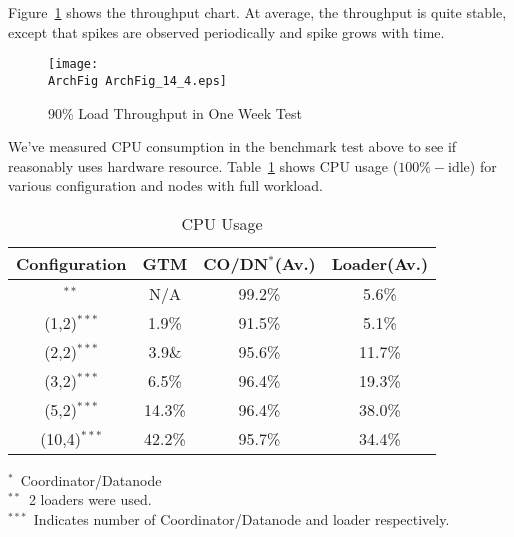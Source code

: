   Figure~\ref{archfig:17} shows the throughput chart. At average, the throughput is quite stable,
  except that spikes are observed periodically and spike grows with time.
  
  \begin{figure}[htp]
	  \begin{center}
		  \texttt{[image: \\ArchFig ArchFig\_14\_4.eps]}
		  \caption{\label{archfig:17}\XC{} 90\% Load Throughput in One Week Test}
	  \end{center}
  \end{figure}





  We've measured CPU consumption in the benchmark test above to see if
  \XC{} reasonably uses hardware resource.
  Table~\ref{tab:ArchCPU} shows CPU usage ($100\% - \mbox{idle}$) for
  various configuration and nodes with full workload.
  
  \begin{table}[htp]
	  \begin{center}
		  \caption{\label{tab:ArchCPU} \XC{} CPU Usage}
		  \begin{tabular}{|c|c|c|c|}
			  \hline
			  Configuration&GTM&CO/DN$^{*}$(Av.)&Loader(Av.)\\\hline
			  \PG$^{**}$&N/A&99.2\%&5.6\%\\\hline
			  \XC(1,2)$^{***}$&1.9\%&91.5\%&5.1\%\\\hline
			  \XC(2,2)$^{***}$&3.9\&&95.6\%&11.7\%\\\hline
			  \XC(3,2)$^{***}$&6.5\%&96.4\%&19.3\%\\\hline
			  \XC(5,2)$^{***}$&14.3\%&96.4\%&38.0\%\\\hline
			  \XC(10,4)$^{***}$&42.2\%&95.7\%&34.4\%\\\hline
		  \end{tabular}

		  {\footnotesize
			{}$^{*}$~Coordinator/Datanode\\
			{}$^{**}$~2 loaders were used.\\
			{}$^{***}$~Indicates number of Coordinator/Datanode and loader respectively.}
  
	  \end{center}
  \end{table}


